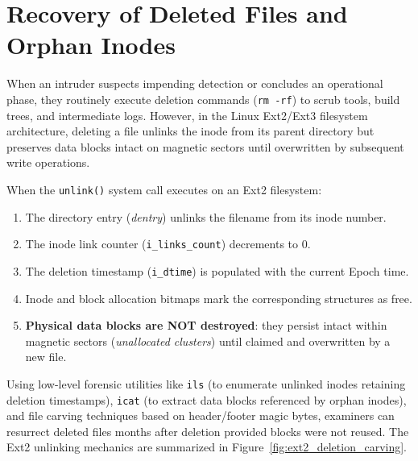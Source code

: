 \chapter{Recovery of Deleted Files and Orphan Inodes}

When an intruder suspects impending detection or concludes an operational phase, they routinely execute deletion commands (\texttt{rm -rf}) to scrub tools, build trees, and intermediate logs. However, in the Linux Ext2/Ext3 filesystem architecture, deleting a file unlinks the inode from its parent directory but preserves data blocks intact on magnetic sectors until overwritten by subsequent write operations.

\begin{notaforense}
When the \texttt{unlink()} system call executes on an Ext2 filesystem:
\begin{enumerate}
    \item The directory entry (\textit{dentry}) unlinks the filename from its inode number.
    \item The inode link counter (\texttt{i\_links\_count}) decrements to 0.
    \item The deletion timestamp (\texttt{i\_dtime}) is populated with the current Epoch time.
    \item Inode and block allocation bitmaps mark the corresponding structures as free.
    \item \textbf{Physical data blocks are NOT destroyed}: they persist intact within magnetic sectors (\textit{unallocated clusters}) until claimed and overwritten by a new file.
\end{enumerate}
Using low-level forensic utilities like \texttt{ils} (to enumerate unlinked inodes retaining deletion timestamps), \texttt{icat} (to extract data blocks referenced by orphan inodes), and file carving techniques based on header/footer magic bytes, examiners can resurrect deleted files months after deletion provided blocks were not reused. The Ext2 unlinking mechanics are summarized in Figure~\ref{fig:ext2_deletion_carving}.
\end{notaforense}

